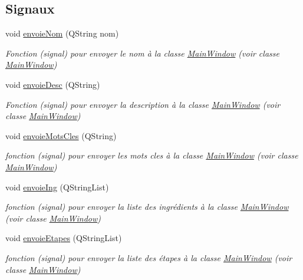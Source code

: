 \subsection*{Signaux}
\begin{DoxyCompactItemize}
\item 
void \hyperlink{classTraitement_a9f84743a77b0074f209eda21d32ee95b}{envoie\+Nom} (Q\+String nom)
\begin{DoxyCompactList}\small\item\em Fonction (signal) pour envoyer le nom à la classe \hyperlink{classMainWindow}{Main\+Window} (voir classe \hyperlink{classMainWindow}{Main\+Window}) \end{DoxyCompactList}\item 
void \hyperlink{classTraitement_a81d1717924fb7a206df394afae4e19dc}{envoie\+Desc} (Q\+String)
\begin{DoxyCompactList}\small\item\em Fonction (signal) pour envoyer la description à la classe \hyperlink{classMainWindow}{Main\+Window} (voir classe \hyperlink{classMainWindow}{Main\+Window}) \end{DoxyCompactList}\item 
void \hyperlink{classTraitement_a4df691c4f46371e6c2b6b4c4df102819}{envoie\+Mots\+Cles} (Q\+String)
\begin{DoxyCompactList}\small\item\em fonction (signal) pour envoyer les mots cles à la classe \hyperlink{classMainWindow}{Main\+Window} (voir classe \hyperlink{classMainWindow}{Main\+Window}) \end{DoxyCompactList}\item 
void \hyperlink{classTraitement_a8db23635eb895875b0f60acece723df4}{envoie\+Ing} (Q\+String\+List)
\begin{DoxyCompactList}\small\item\em fonction (signal) pour envoyer la liste des ingrédients à la classe \hyperlink{classMainWindow}{Main\+Window} (voir classe \hyperlink{classMainWindow}{Main\+Window}) \end{DoxyCompactList}\item 
void \hyperlink{classTraitement_ae58a2b32e2632bfc11a696c186ace3b7}{envoie\+Etapes} (Q\+String\+List)
\begin{DoxyCompactList}\small\item\em fonction (signal) pour envoyer la liste des étapes à la classe \hyperlink{classMainWindow}{Main\+Window} (voir classe \hyperlink{classMainWindow}{Main\+Window}) \end{DoxyCompactList}\item 

\end{DoxyCompactItemize}
